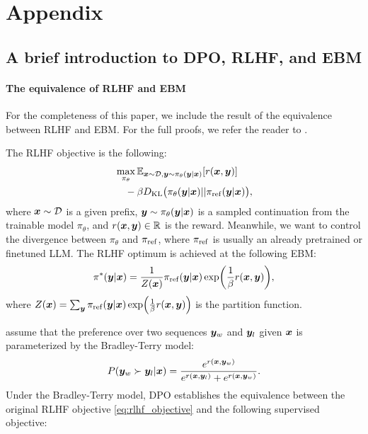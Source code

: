 \section{Appendix}

\subsection{A brief introduction to DPO, RLHF, and EBM}

\paragraph{The equivalence of RLHF and EBM} For the completeness of this paper, we include the result of the equivalence between RLHF and EBM. For the full proofs, we refer the reader to \cite{rafailov2023direct,korbak2022rl}.

The RLHF objective is the following:
\begin{align}\label{eq:rlhf_objective}
\begin{split}
		& \max_{\pi_\theta} \E_{\vx\sim\gD, \vy\sim\pi_\theta(\vy|\vx)}[r(\vx, \vy)] \\
		& \quad-\beta \KL\p{\pi_\theta(\vy|\vx)||\pr(\vy|\vx)},
\end{split}
\end{align}
where ${\bm{x}}\sim\mathcal{D}$ is a given prefix, ${\bm{y}}\sim\pi_\theta({\bm{y}}|{\bm{x}})$ is a sampled continuation from the trainable model $\pi_\theta$, and $r({\bm{x}}, {\bm{y}})\in \mathbb{R}$ is the reward. Meanwhile, we want to control the divergence between $\pi_\theta$ and $\pi_{\operatorname{ref}}$, where $\pi_{\operatorname{ref}}$ is usually an already pretrained or finetuned LLM.
The RLHF optimum is achieved at the following EBM:
\begin{align}\label{eq:rlhf_ebm}
	\pi^*(\vy|\vx) = \frac{1}{Z(\vx)}\pr(\vy|\vx)\exp\p{\frac{1}{\beta}r(\vx,\vy)},
\end{align}
where $Z(\vx)=\sum_{\vy}\pr(\vy|\vx)\exp\p{\frac{1}{\beta}r(\vx,\vy)}$ is the partition function.


\citet{rafailov2023direct} assume that the preference over two sequences ${\bm{y}}_w$ and ${\bm{y}}_l$ given ${\bm{x}}$ is parameterized by the Bradley-Terry model:
\[
 P({\bm{y}}_w\succ{\bm{y}}_l|{\bm{x}})=\frac{e^{r({\bm{x}}, {\bm{y}}_w)}}{e^{r({\bm{x}}, {\bm{y}}_l)}+e^{r({\bm{x}}, {\bm{y}}_w)}}.
\]
Under the Bradley-Terry model, DPO establishes the equivalence between the original RLHF objective \cref{eq:rlhf_objective} and the following supervised objective:

